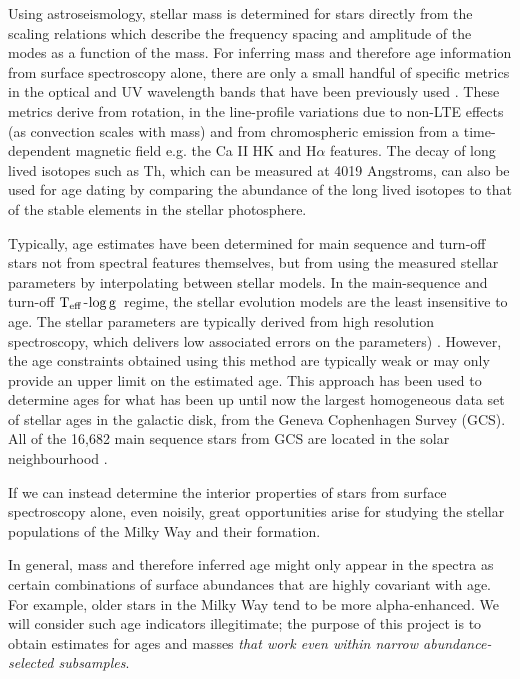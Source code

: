 \documentclass[12pt, preprint]{aastex}
\newcommand{\teff}{\mbox{$\rm T_{eff}$}}
\newcommand{\logg}{\mbox{$\rm \log g$}}
\begin{document}
Using astroseismology, stellar mass is determined for stars directly from the scaling relations which describe the frequency spacing and amplitude of the modes as a function of the mass. For inferring mass and therefore age information from surface spectroscopy alone, there are only a small handful of specific metrics in the optical and UV wavelength bands that have been previously used  \citep[see][and references therein]{soderblom2010}. These metrics derive from rotation, in the line-profile variations due to non-LTE effects (as convection scales with mass) and from chromospheric emission from a time-dependent magnetic field e.g. the Ca II HK and H$\alpha$ features. The decay of long lived isotopes such as Th, which can be measured at 4019 Angstroms, can also be used for age dating by comparing the abundance of the long lived isotopes to that of the stable elements in the stellar photosphere. 


Typically, age estimates have been determined for main sequence and turn-off stars not from spectral features themselves, but from using the measured stellar parameters by interpolating between stellar models. In the main-sequence and turn-off \teff-\logg\ regime, the stellar evolution models are the least insensitive to age. The stellar parameters are typically derived from high resolution spectroscopy, which delivers low associated errors on the parameters) \citep[e.g.][]{Bensby2013, Casagrande2011, haywood2013}.   However, the age constraints obtained using this method are typically weak or may only provide an upper limit on the estimated age.  This approach has been used to determine ages for what has been up until now the largest homogeneous data set of stellar ages in the galactic disk, from the Geneva Cophenhagen Survey (GCS). All of the 16,682 main sequence stars from GCS are located in the solar neighbourhood \citep{nordstrom2004short}.

If we can instead determine the interior properties of stars from surface
spectroscopy alone, even noisily, great opportunities arise for
studying the stellar populations of the Milky Way and their formation. 

In general, mass and therefore inferred age might only appear in the spectra as
certain combinations of surface abundances that are highly covariant
with age.  For example, older stars in the Milky Way tend to be more
alpha-enhanced.  We will consider such age indicators illegitimate;
the purpose of this project is to obtain estimates for ages and masses \emph{that work even within narrow abundance-selected subsamples}.
\end{document}
